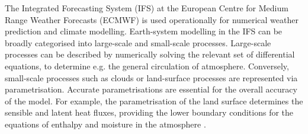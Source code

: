 \documentclass[hess, manuscript]{copernicus}
\begin{document}
\noindent The Integrated Forecasting System (IFS) at the European Centre for Medium Range Weather Forecasts (ECMWF) is used operationally for numerical weather prediction and climate modelling. Earth-system modelling in the IFS can be broadly categorised into large-scale and small-scale processes. Large-scale processes can be described by numerically solving the relevant set of differential equations, to determine e.g. the general circulation of atmosphere. Conversely, small-scale processes such as clouds or land-surface processes are represented via parametrisation. Accurate parametrisations are essential for the overall accuracy of the model. For example, the parametrisation of the land surface determines the sensible and latent heat fluxes, providing the lower boundary conditions for the equations of enthalpy and moisture in the atmosphere \citep{p16960}. \newline 
\end{document}
